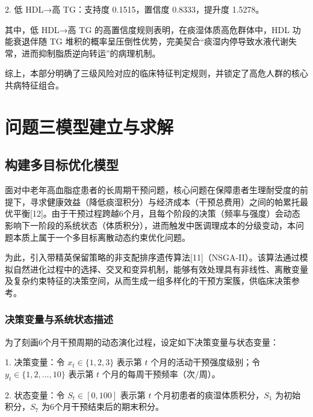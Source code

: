 \documentclass[12pt]{article}
\begin{document}
	{\songti{}
		2.  低 HDL→高 TG：支持度 0.1515，置信度 0.8333，提升度 1.5278。
		\par}
	
	{\songti{}
		其中，低 HDL→高 TG 的高置信度规则表明，在痰湿体质高危群体中，HDL 功能衰退伴随 TG 堆积的概率呈压倒性优势，完美契合“痰湿内停导致水液代谢失常，进而抑制脂质逆向转运”的病理机制。
		\par}
	
	{\songti{}
		综上，本部分明确了三级风险对应的临床特征判定规则，并锁定了高危人群的核心共病特征组合。
		\par}
	
	\section{问题三模型建立与求解}
	
	\subsection{构建多目标优化模型}
	{\songti{}
		面对中老年高血脂症患者的长周期干预问题，核心问题在保障患者生理耐受度的前提下，寻求健康效益（降低痰湿积分）与经济成本（干预总费用）之间的帕累托最优平衡[12]。由于干预过程跨越6个月，且每个阶段的决策（频率与强度）会动态影响下一阶段的系统状态（体质积分），进而触发中医调理成本的分级变动，本问题本质上属于一个多目标离散动态约束优化问题。
		\par}
	
	{\songti{}
		为此，引入带精英保留策略的非支配排序遗传算法[11]（NSGA-II）。该算法通过模拟自然进化过程中的选择、交叉和变异机制，能够有效处理具有非线性、离散变量及复杂约束特征的决策空间，从而生成一组多样化的干预方案簇，供临床决策参考。
		\par}
	
	\subsubsection{决策变量与系统状态描述}
	{\songti{}
		为了刻画6个月干预周期的动态演化过程，设定如下决策变量与状态变量：
		\par}
	
	{\songti{}
		1.  决策变量：令 $x_t \in \{1,2,3\}$ 表示第 $t$ 个月的活动干预强度级别；令 $y_t \in \{1,2,...,10\}$ 表示第 $t$ 个月的每周干预频率（次/周）。
		\par}
	
	{\songti{}
		2.  状态变量：令 $S_t \in [0,100]$ 表示第 $t$ 个月初患者的痰湿体质积分，$S_1$ 为初始积分，$S_7$ 为6个月干预结束后的期末积分。
		\par}
	
\end{document}
